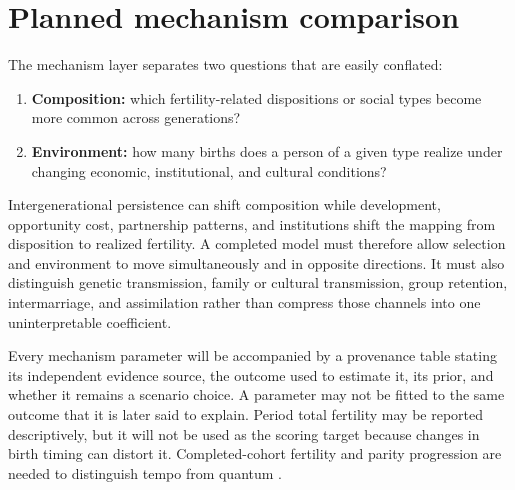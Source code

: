 \section{Planned mechanism comparison}


The mechanism layer separates two questions that are easily conflated:
\begin{enumerate}
  \item \textbf{Composition:} which fertility-related dispositions or social
  types become more common across generations?
  \item \textbf{Environment:} how many births does a person of a given type
  realize under changing economic, institutional, and cultural conditions?
\end{enumerate}

Intergenerational persistence can shift composition while development,
opportunity cost, partnership patterns, and institutions shift the mapping
from disposition to realized fertility. A completed model must therefore allow
selection and environment to move simultaneously and in opposite directions.
It must also distinguish genetic transmission, family or cultural transmission,
group retention, intermarriage, and assimilation rather than compress those
channels into one uninterpretable coefficient.

Every mechanism parameter will be accompanied by a provenance table stating
its independent evidence source, the outcome used to estimate it, its prior,
and whether it remains a scenario choice. A parameter may not be fitted to the
same outcome that it is later said to explain. Period total fertility may be
reported descriptively, but it will not be used as the scoring target because
changes in birth timing can distort it. Completed-cohort fertility and parity
progression are needed to distinguish tempo from quantum
\citep{bongaarts1998}.
